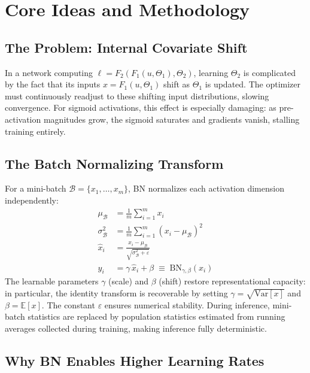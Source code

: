 \documentclass{article}
\begin{document}
\section{Core Ideas and Methodology}

\subsection{The Problem: Internal Covariate Shift}

In a network computing $\ell = F_2(F_1(u, \Theta_1), \Theta_2)$, learning $\Theta_2$ is
complicated by the fact that its inputs $x = F_1(u, \Theta_1)$ shift as $\Theta_1$ is updated.
The optimizer must continuously readjust to these shifting input distributions, slowing
convergence. For sigmoid activations, this effect is especially damaging: as pre-activation
magnitudes grow, the sigmoid saturates and gradients vanish, stalling training entirely.

\subsection{The Batch Normalizing Transform}

For a mini-batch $\mathcal{B} = \{x_1, \ldots, x_m\}$, BN normalizes each activation dimension
independently:
\begin{align}
  \mu_\mathcal{B} &= \frac{1}{m} \sum_{i=1}^{m} x_i \\[4pt]
  \sigma^2_\mathcal{B} &= \frac{1}{m} \sum_{i=1}^{m} (x_i - \mu_\mathcal{B})^2 \\[4pt]
  \hat{x}_i &= \frac{x_i - \mu_\mathcal{B}}{\sqrt{\sigma^2_\mathcal{B} + \varepsilon}} \\[4pt]
  y_i &= \gamma\, \hat{x}_i + \beta \;\equiv\; \mathrm{BN}_{\gamma,\beta}(x_i)
\end{align}
The learnable parameters $\gamma$ (scale) and $\beta$ (shift) restore representational capacity:
in particular, the identity transform is recoverable by setting $\gamma = \sqrt{\mathrm{Var}[x]}$
and $\beta = \mathbb{E}[x]$. The constant $\varepsilon$ ensures numerical stability. During
inference, mini-batch statistics are replaced by population statistics estimated from running
averages collected during training, making inference fully deterministic.

\subsection{Why BN Enables Higher Learning Rates}
\end{document}
